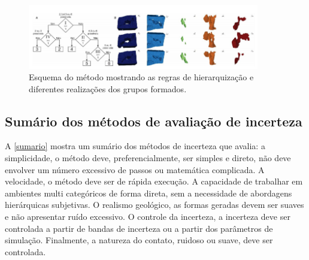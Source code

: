\begin{figure}[H]
	\caption{\label{hier_ex}Esquema do método mostrando as regras de hierarquização e diferentes realizações dos grupos formados.}
	\begin{center}
		\includegraphics[width=0.9\textwidth]{capitulo_2/hier_example.png}
	\end{center}
\end{figure}

\subsection{Sumário dos métodos de avaliação de incerteza}

A \autoref{sumario} mostra um sumário dos métodos de incerteza que avalia: a simplicidade, o método deve, preferencialmente, ser simples e direto, não deve envolver um número excessivo de passos ou matemática complicada. A velocidade, o método deve ser de rápida execução. A capacidade de trabalhar em ambientes multi categóricos de forma direta, sem a necessidade de abordagens hierárquicas subjetivas. O realismo geológico, as formas geradas devem ser suaves e não apresentar ruído excessivo. O controle da incerteza, a incerteza deve ser controlada a partir de bandas de incerteza ou a partir dos parâmetros de simulação. Finalmente, a natureza do contato, ruidoso ou suave, deve ser controlada.

\begin{table}[H]
  \centering
  \caption{Sumário dos métodos de avaliação de incerteza de modelos geológicos.}\label{sumario}%
\end{table}%




